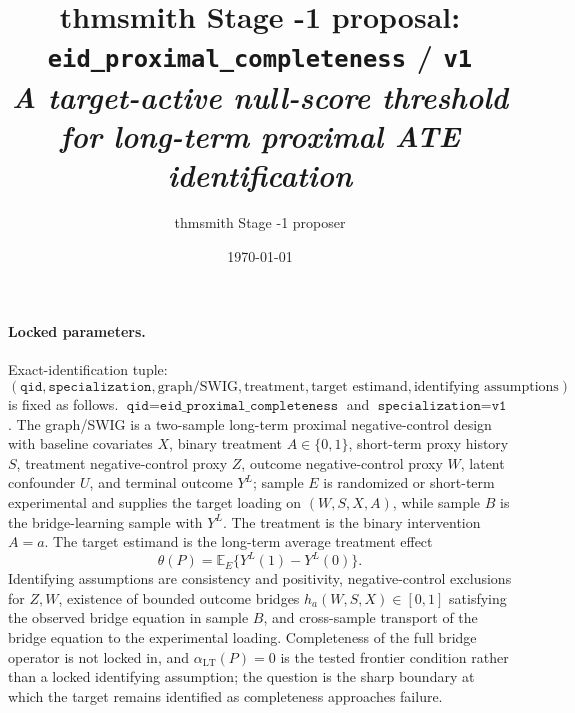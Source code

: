 \documentclass[11pt]{article}
\title{thmsmith Stage -1 proposal: \texttt{eid\_proximal\_completeness} / \texttt{v1}%
  \\ \large\textit{A target-active null-score threshold for long-term proximal ATE identification}}
\author{thmsmith Stage -1 proposer}
\date{\today}
\newcommand{\E}{\mathbb{E}}
\theoremstyle{definition}
\theoremstyle{plain}
\theoremstyle{remark}
\begin{document}
\maketitle


\paragraph{Locked parameters.}
Exact-identification tuple:
\[
(\texttt{qid},\texttt{specialization},\text{graph/SWIG},\text{treatment},
\text{target estimand},\text{identifying assumptions})
\]
is fixed as follows.  \(\texttt{qid}=\texttt{eid\_proximal\_completeness}\) and
\(\texttt{specialization}=\texttt{v1}\).  The graph/SWIG is a two-sample
long-term proximal negative-control design with baseline covariates \(X\),
binary treatment \(A\in\{0,1\}\), short-term proxy history \(S\), treatment
negative-control proxy \(Z\), outcome negative-control proxy \(W\), latent
confounder \(U\), and terminal outcome \(Y^L\); sample \(E\) is randomized or
short-term experimental and supplies the target loading on \((W,S,X,A)\), while
sample \(B\) is the bridge-learning sample with \(Y^L\).  The treatment is the
binary intervention \(A=a\).  The target estimand is the long-term average
treatment effect
\[
\theta(P)=\E_E\{Y^L(1)-Y^L(0)\}.
\]
Identifying assumptions are consistency and positivity, negative-control
exclusions for \(Z,W\), existence of bounded outcome bridges
\(h_a(W,S,X)\in[0,1]\) satisfying the observed bridge equation in sample \(B\),
and cross-sample transport of the bridge equation to the experimental loading.
Completeness of the full bridge operator is not locked in, and
\(\alpha_{\mathrm{LT}}(P)=0\) is the tested frontier condition rather than a
locked identifying assumption; the question is the sharp boundary at which the
target remains identified as completeness approaches failure.
\end{document}
